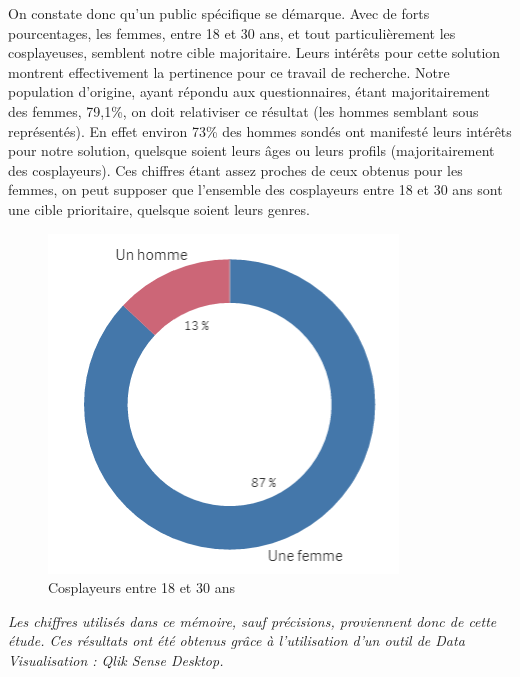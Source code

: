 \documentclass[a4paper,12pt]{article}
\begin{document}
On constate donc qu'un public spécifique se démarque. Avec de forts pourcentages, les femmes, entre 18 et 30 ans, et tout particulièrement les cosplayeuses, semblent notre cible majoritaire. Leurs intérêts pour cette solution montrent effectivement la pertinence pour ce travail de recherche.  Notre population d'origine, ayant répondu aux questionnaires, étant majoritairement des femmes, 79,1\%, on doit relativiser ce résultat (les hommes semblant sous représentés). En effet environ 73\% des hommes sondés ont manifesté leurs intérêts pour notre solution, quelsque soient leurs âges ou leurs profils (majoritairement des cosplayeurs). 
Ces chiffres étant assez proches de ceux obtenus pour les femmes, on peut supposer que l'ensemble des cosplayeurs entre 18 et 30 ans sont une cible prioritaire, quelsque soient leurs genres. 
\begin{figure}[!ht]
\centering
			\includegraphics[scale=0.8]{images/femme.PNG}
			\caption{Cosplayeurs entre 18 et 30 ans}
		\end{figure}

\textit{Les chiffres utilisés dans ce mémoire, sauf précisions, proviennent donc de cette étude. Ces résultats ont été obtenus grâce à l'utilisation d'un outil de Data Visualisation : Qlik Sense Desktop.}
\end{document}
